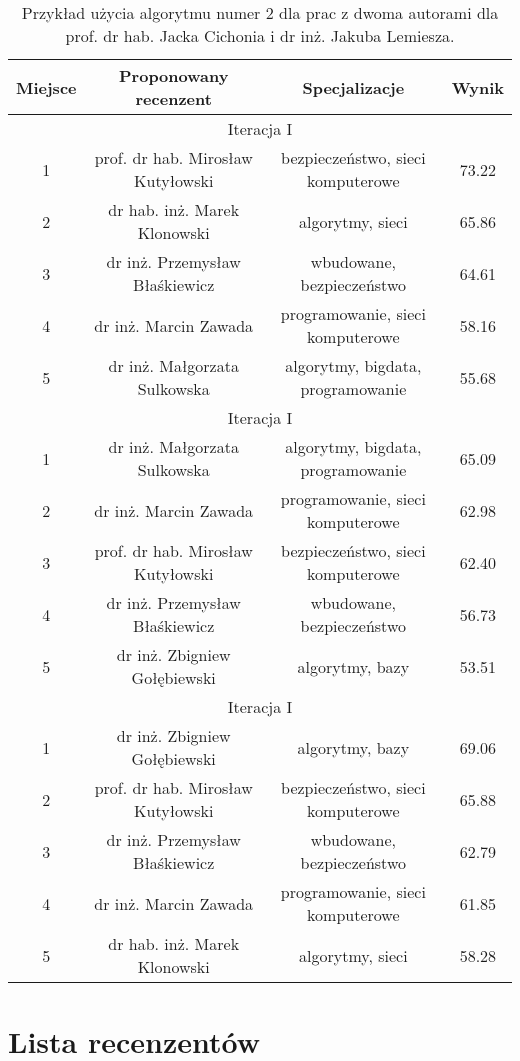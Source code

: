 \begin{table}[h]
        \centering
\begin{tabular}{c|c|c|c}
Miejsce  & Proponowany recenzent & Specjalizacje&Wynik \\  \hline
\multicolumn{4}{c|}{Iteracja I} \\ \hline
1&prof. dr hab. Mirosław Kutyłowski&bezpieczeństwo, sieci komputerowe&  73.22\\
2&dr hab. inż. Marek Klonowski&algorytmy, sieci&65.86\\
3&dr inż. Przemysław Błaśkiewicz&wbudowane, bezpieczeństwo&64.61\\
4&dr inż. Marcin Zawada&programowanie, sieci komputerowe&58.16\\
5&dr inż. Małgorzata Sulkowska& algorytmy, bigdata, programowanie&55.68\\ \hline
\multicolumn{4}{c|}{Iteracja I} \\ \hline
1&dr inż. Małgorzata Sulkowska&algorytmy, bigdata, programowanie& 65.09\\
2&dr inż. Marcin Zawada&programowanie, sieci komputerowe&62.98\\
3&prof. dr hab. Mirosław Kutyłowski&bezpieczeństwo, sieci komputerowe&  62.40\\
4&dr inż. Przemysław Błaśkiewicz&wbudowane, bezpieczeństwo& 56.73\\
5&dr inż. Zbigniew Gołębiewski&algorytmy, bazy& 53.51\\ \hline
\multicolumn{4}{c|}{Iteracja I} \\ \hline
1&dr inż. Zbigniew Gołębiewski&algorytmy, bazy& 69.06\\
2&prof. dr hab. Mirosław Kutyłowski&bezpieczeństwo, sieci komputerowe&  65.88\\
3&dr inż. Przemysław Błaśkiewicz&wbudowane, bezpieczeństwo&62.79\\
4&dr inż. Marcin Zawada&programowanie, sieci komputerowe&61.85\\
5&dr hab. inż. Marek Klonowski &algorytmy, sieci& 58.28\\ \hline

\end{tabular}
\caption{Przykład użycia algorytmu numer 2 dla prac z dwoma autorami dla prof. dr hab. Jacka Cichonia i dr inż. Jakuba Lemiesza.}
\label{table:3}
\end{table}


\section{Lista recenzentów}

